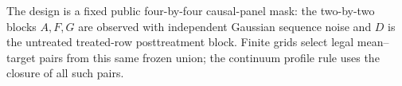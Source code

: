 The design is a fixed public four-by-four causal-panel mask: the two-by-two blocks \(A,F,G\) are observed with independent Gaussian sequence noise and \(D\) is the untreated treated-row posttreatment block.  Finite grids select legal mean--target pairs from this same frozen union; the continuum profile rule uses the closure of all such pairs.